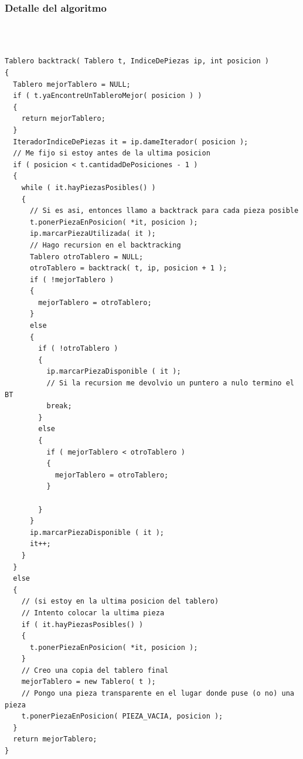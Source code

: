 \documentclass[11pt, a4paper, twoside]{article}
\begin{document}
\subsubsection{Detalle del algoritmo}
\begin{paragraph}\
\begin{verbatim}

Tablero backtrack( Tablero t, IndiceDePiezas ip, int posicion )
{
  Tablero mejorTablero = NULL;
  if ( t.yaEncontreUnTableroMejor( posicion ) )
  {
    return mejorTablero;
  }
  IteradorIndiceDePiezas it = ip.dameIterador( posicion );
  // Me fijo si estoy antes de la ultima posicion
  if ( posicion < t.cantidadDePosiciones - 1 )
  {
    while ( it.hayPiezasPosibles() )
    {
      // Si es asi, entonces llamo a backtrack para cada pieza posible
      t.ponerPiezaEnPosicion( *it, posicion );
      ip.marcarPiezaUtilizada( it );
      // Hago recursion en el backtracking
      Tablero otroTablero = NULL;
      otroTablero = backtrack( t, ip, posicion + 1 );
      if ( !mejorTablero )
      {
        mejorTablero = otroTablero;
      }
      else
      {
        if ( !otroTablero )
        {
          ip.marcarPiezaDisponible ( it );
          // Si la recursion me devolvio un puntero a nulo termino el BT
          break;
        }
        else
        {
          if ( mejorTablero < otroTablero )
          {
            mejorTablero = otroTablero;
          }

        }
      }
      ip.marcarPiezaDisponible ( it );
      it++;
    }
  }
  else
  {
    // (si estoy en la ultima posicion del tablero)
    // Intento colocar la ultima pieza
    if ( it.hayPiezasPosibles() )
    {
      t.ponerPiezaEnPosicion( *it, posicion );
    }
    // Creo una copia del tablero final
    mejorTablero = new Tablero( t );
    // Pongo una pieza transparente en el lugar donde puse (o no) una pieza
    t.ponerPiezaEnPosicion( PIEZA_VACIA, posicion );
  }
  return mejorTablero;
}
\end{verbatim}

\end{paragraph}


\newpage
\end{document}
